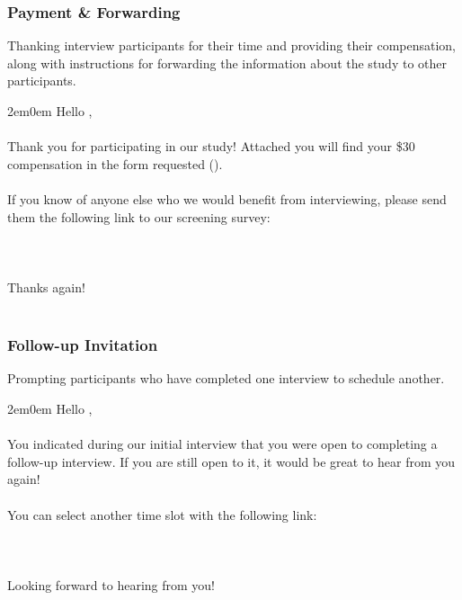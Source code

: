 \subsubsection{Payment \& Forwarding}
Thanking interview participants for their time and providing their compensation, along with instructions for forwarding the information about the study to other participants.
\\
\begin{adjustwidth}{2em}{0em}
\noindent Hello ,
\\\\
\noindent Thank you for participating in our study! Attached you will find your \$30 compensation in the
form requested ().
\\\\
\noindent If you know of anyone else who we would benefit from interviewing, please send them the following link to our screening survey:
\\\\
\\\\
\noindent Thanks again!
\\\\
\end{adjustwidth}


\subsubsection{Follow-up Invitation}
Prompting participants who have completed one interview to schedule another.
\begin{adjustwidth}{2em}{0em}
\noindent Hello ,
\\\\
\noindent You indicated during our initial interview that you were open to completing a follow-up interview.
If you are still open to it, it would be great to hear from you again!
\\\\
\noindent You can select another time slot with the following link:
\\\\
\\\\
\noindent Looking forward to hearing from you!
\\\\
\end{adjustwidth}


